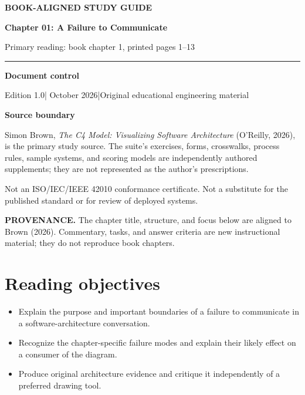 \documentclass[10pt,letterpaper]{article}
\newcommand{\SourceNote}[1]{\par\smallskip\noindent\colorbox{C4Light}{\parbox{0.94\linewidth}{\footnotesize\textbf{PROVENANCE.} #1}}\par\medskip}
\newcommand{\DocStart}[3]{%
\begin{document}
\begin{titlepage}
\renewcommand{\thepage}{title-\arabic{page}}
\vspace*{0.55in}
{\sffamily\bfseries\small\color{C4Teal}#1}\par\vspace{0.24in}
{\sffamily\bfseries\fontsize{26}{31}\selectfont\color{C4Navy}#2}\par\vspace{0.18in}
{\large\color{C4Gray}#3}\par\vspace{0.4in}
\textcolor{C4Teal}{\rule{\linewidth}{1.15pt}}\par\vspace{0.24in}
\textbf{Document control}\par
Edition 1.0\quad|\quad 30 October 2026\quad|\quad Original educational engineering material\par
\vspace{0.17in}
\textbf{Source boundary}\par
Simon Brown, \emph{The C4 Model: Visualizing Software Architecture} (O'Reilly, 2026), is the primary study source. The suite's exercises, forms, crosswalks, process rules, sample systems, and scoring models are independently authored supplements; they are not represented as the author's prescriptions.\par
\vfill
{\small\color{C4Gray}Not an ISO/IEC/IEEE 42010 conformance certificate. Not a substitute for the published standard or for review of deployed systems.}\par
\end{titlepage}
}
\DocStart{BOOK-ALIGNED STUDY GUIDE}{Chapter 01: A Failure to Communicate}{Primary reading: book chapter 1, printed pages 1–13}
\SourceNote{The chapter title, structure, and focus below are aligned to Brown (2026). Commentary, tasks, and answer criteria are new instructional material; they do not reproduce book chapters.}
\section{Reading objectives}
\begin{itemize}
\item Explain the purpose and important boundaries of a failure to communicate in a software-architecture conversation.
\item Recognize the chapter-specific failure modes and explain their likely effect on a consumer of the diagram.
\item Produce original architecture evidence and critique it independently of a preferred drawing tool.
\end{itemize}
\end{document}
